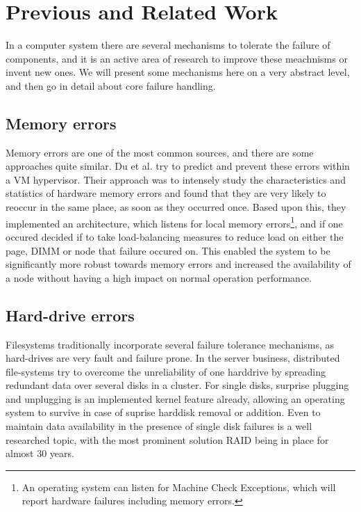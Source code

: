 \documentclass[a4paper,10pt,twoside]{article}
\begin{document}
\section{Previous and Related Work}
In a computer system there are several mechanisms to tolerate the failure of components, and it is an active area of research to improve these meachnisms or invent new ones. We will present some mechanisms here on a very abstract level, and then go in detail about core failure handling.


\subsection{Memory errors}
Memory errors are one of the most common sources, and there are some approaches quite similar. Du et al. \cite{MemErrPrediction} try to predict and prevent these errors within a VM hypervisor. Their approach was to intensely study the characteristics and statistics of hardware memory errors and found that they are very likely to reoccur in the same place, as soon as they occurred once. Based upon this, they implemented an architecture, which listens for local memory errors\footnote{An operating system can listen for Machine Check Exceptions, which will report hardware failures including memory errors.}, and if one occured decided if to take load-balancing measures to reduce load on either the page, DIMM or node that failure occured on. This enabled the system to be significantly more robust towards memory errors and increased the availability of a node without having a high impact on normal operation performance.

\subsection{Hard-drive errors}
Filesystems traditionally incorporate several failure tolerance mechanisms, as hard-drives are very fault and failure prone. In the server business, distributed file-systems try to overcome the unreliability of one harddrive by spreading redundant data over several disks in a cluster. For single disks, surprise plugging and unplugging is an implemented kernel feature already, allowing an operating system to survive in case of suprise harddisk removal or addition. %
Even to maintain data availability in the presence of single disk failures is a well researched topic, with the most prominent solution RAID \cite{RAID} being in place for almost 30 years.
\end{document}
